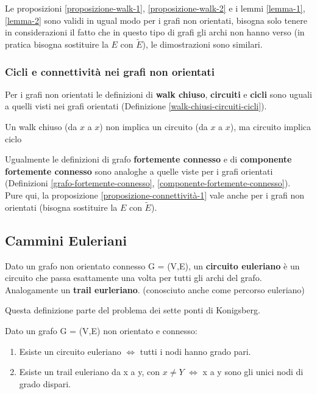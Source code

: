 Le proposizioni \ref{proposizione-walk-1}, \ref{proposizione-walk-2} e i lemmi \ref{lemma-1}, \ref{lemma-2}  sono validi in ugual modo per i grafi non orientati, bisogna solo tenere in considerazioni il fatto che in questo tipo di grafi gli archi non hanno verso (in pratica bisogna sostituire la $E$ con $\widetilde{E}$), le dimostrazioni sono similari.

\subsubsection{Cicli e connettività nei grafi non orientati}
Per i grafi non orientati le definizioni di \textbf{walk chiuso}, \textbf{circuiti} e \textbf{cicli} sono uguali a quelli visti nei grafi orientati (Definizione \ref{walk-chiusi-circuiti-cicli}).
\begin{note}
Un walk chiuso (da $x$ a $x$) non implica un circuito (da $x$ a $x$), ma circuito implica ciclo
\end{note}
Ugualmente le definizioni di grafo \textbf{fortemente connesso} e  di \textbf{componente fortemente connesso} sono analoghe a quelle viste per i grafi orientati (Definizioni \ref{grafo-fortemente-connesso}, \ref{componente-fortemente-connesso}).\\
Pure qui, la proposizione \ref{proposizione-connettività-1} vale anche per i grafi non orientati (bisogna sostituire la $E$ con $\widetilde{E}$).


\subsection{Cammini Euleriani}
\begin{definition}
    Dato un grafo non orientato connesso G = (V,E), un \textbf{circuito euleriano} è un circuito che passa esattamente una volta per tutti gli archi del grafo. Analogamente un \textbf{trail eurleriano}. (conosciuto anche come percorso euleriano)
\end{definition}
Questa definizione parte del problema dei sette ponti di Konigsberg.
\begin{theorem}
Dato un grafo G = (V,E) non orientato e connesso:
\begin{enumerate}
    \item Esiste un circuito euleriano $\Longleftrightarrow$ tutti i nodi hanno grado pari.
    \item Esiste un trail euleriano da x a y, con $x \neq Y$ $\Longleftrightarrow$ x a y sono gli unici nodi di grado dispari.
\end{enumerate}
\end{theorem}

